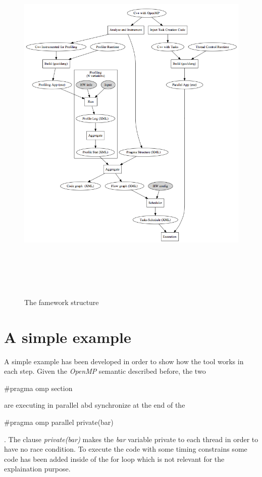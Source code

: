 \documentclass[a4paper,11pt,oneside]{book}
\begin{document}
\begin{figure}[H]
\centering
\includegraphics[width = 160mm, height = 180mm]{framework.png}
\caption{The famework structure}
\label{framework}
\end{figure}


\section{A simple example}
\label{example}
A simple example has been developed in order to show how the tool works in each step. Given the \emph{OpenMP} semantic described before, the two \begin{bf}$\#$pragma omp section\end{bf} are executing in parallel abd synchronize at the end of the \begin{bf}$\#$pragma omp parallel private(bar)\end{bf}. The clause \emph{private(bar)} makes the \emph{bar} variable private to each thread in order to have no race condition. To execute the code with some timing constrains some code has been added inside of the for loop which is not relevant for the explaination purpose.
\end{document}
